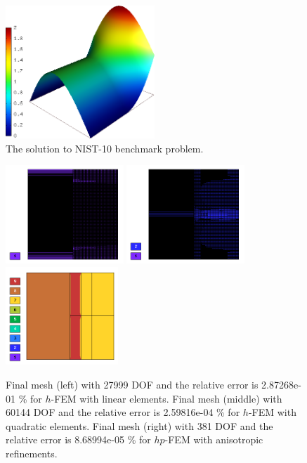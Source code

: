 \documentclass[12pt]{elsarticle}
\begin{document}
\begin{figure}[H]
\centering
\vspace{-6mm}
\includegraphics[height=5cm]{nist/nist-10/solution.png}
\vspace{-3mm}
\caption{The solution to NIST-10 benchmark problem.}
\vspace{-3mm}
\label{fig:sln-nist10}
\end{figure}

\begin{figure}[H]
\centering
\vspace{-3mm}
\includegraphics[height=3.7cm]{nist/nist-10/mesh_h1_aniso.png}
\includegraphics[height=3.7cm]{nist/nist-10/mesh_h2_aniso.png}
\includegraphics[height=3.7cm]{nist/nist-10/mesh_hp_aniso.png}
\vspace{-3mm}
\caption{
Final mesh (left) with 27999 DOF and the relative error is 2.87268e-01 \% for $h$-FEM with linear elements.
Final mesh (middle) with 60144 DOF and the relative error is 2.59816e-04 \% for $h$-FEM with quadratic elements.
Final mesh (right) with 381 DOF and the relative error is 8.68994e-05 \% for $hp$-FEM with anisotropic refinements.}
\vspace{-3mm}
\label{fig:nist-10-hp-aniso}
\end{figure}
\end{document}
